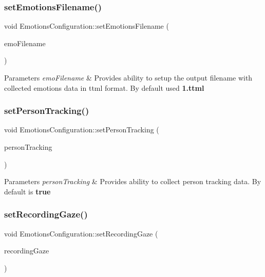 \subsubsection{\texorpdfstring{set\+Emotions\+Filename()}{setEmotionsFilename()}}
{\footnotesize\ttfamily void Emotions\+Configuration\+::set\+Emotions\+Filename (\begin{DoxyParamCaption}\item[{pxc\+C\+H\+AR $\ast$}]{emo\+Filename }\end{DoxyParamCaption})}


\begin{DoxyParams}{Parameters}
{\em emo\+Filename} & Provides ability to setup the output filename with collected emotions data in ttml format. By default used {\bfseries 1.\+ttml}\\
\hline
\end{DoxyParams}
\mbox{\label{class_emotions_configuration_afa77034583065b49e1ed9bdfe4ad1d77}} 
\subsubsection{\texorpdfstring{set\+Person\+Tracking()}{setPersonTracking()}}
{\footnotesize\ttfamily void Emotions\+Configuration\+::set\+Person\+Tracking (\begin{DoxyParamCaption}\item[{pxc\+Bool}]{person\+Tracking }\end{DoxyParamCaption})}


\begin{DoxyParams}{Parameters}
{\em person\+Tracking} & Provides ability to collect person tracking data. By default is {\bfseries true}\\
\hline
\end{DoxyParams}
\mbox{\label{class_emotions_configuration_af52d273380cd9392a2ff104b774b5da9}} 
\subsubsection{\texorpdfstring{set\+Recording\+Gaze()}{setRecordingGaze()}}
{\footnotesize\ttfamily void Emotions\+Configuration\+::set\+Recording\+Gaze (\begin{DoxyParamCaption}\item[{pxc\+Bool}]{recording\+Gaze }\end{DoxyParamCaption})}


